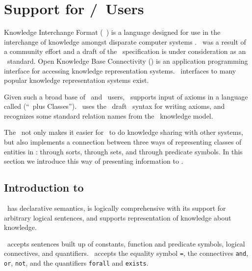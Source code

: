 



\section{Support for \kif\//\okbc\   Users}
\label{sec-kif-snark}

Knowledge Interchange Format (\kif\  ) is a language designed for use in
the interchange of knowledge amongst disparate computer systems
\cite{kif}. \Kif\   was a result of a community effort and a draft of the
\kif\   specification is under consideration as an \ansi\  standard.  Open
Knowledge Base Connectivity (\okbc) is an application programming
interface for accessing knowledge representation systems. \Okbc\   interfaces
to many popular knowledge representation systems exist.

Given such a broad base of \kif\   and \okbc\   users, \snark\  supports input
of axioms in a language called \kifsnark (``\kif\  plus
Classes''). \kifsnark\  uses the \ansi\  draft \kif\   syntax for writing
axioms, and recognizes some standard relation names from the \okbc\
knowledge model.

The \kifsnark\  not only makes it easier for \snark\  to do knowledge
sharing with other systems, but also implements a connection between
three ways of representing classes of entities in
\snark\/: through sorts, through sets, and through predicate symbols.  In
this section we introduce this way of presenting information to \snark\/.

\subsection{Introduction to \Kif}

\Kif\  has declarative semantics, is logically comprehensive with its
support for arbitrary logical sentences, and supports representation
of knowledge about knowledge.

\Kif\   accepts sentences built up of constants, function and predicate symbols,
logical connectives, and quantifiers.  \Kif\  accepts the equality
symbol \verb'=', the connectives \verb'and', \verb'or', \verb'not',
and the quantifiers \verb'forall' and \verb'exists'.



